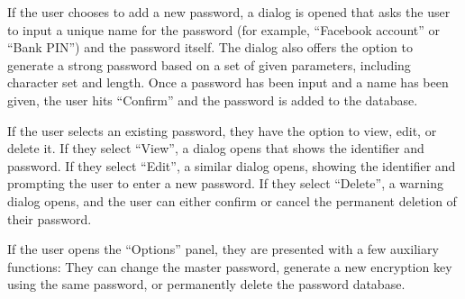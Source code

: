 \documentclass [oneside, letterpaper] {article}
\begin{document}
        If the user chooses to add a new password, a dialog is opened that
        asks the user to input a unique name for the password (for example,
        ``Facebook account'' or ``Bank PIN'') and the password itself. The
        dialog also offers the option to generate a strong password based on a
        set of given parameters, including character set and length. Once a
        password has been input and a name has been given, the user hits
        ``Confirm'' and the password is added to the database.

        If the user selects an existing password, they have the option to view,
        edit, or delete it. If they select ``View'', a dialog opens that shows
        the identifier and password. If they select ``Edit'', a similar dialog
        opens, showing the identifier and prompting the user to enter a new
        password. If they select ``Delete'', a warning dialog opens, and the
        user can either confirm or cancel the permanent deletion of their
        password.

        If the user opens the ``Options'' panel, they are presented with a few
        auxiliary functions: They can change the master password, generate a
        new encryption key using the same password, or permanently delete the
        password database.
\end{document}
